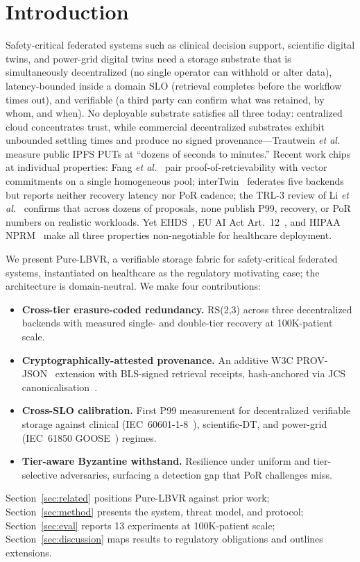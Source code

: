 \section{Introduction}
\label{sec:intro}

Safety-critical federated systems such as clinical decision support, scientific digital twins, and power-grid digital twins need a storage substrate that is simultaneously decentralized (no single operator can withhold or alter data), latency-bounded inside a domain SLO (retrieval completes before the workflow times out), and verifiable (a third party can confirm what was retained, by whom, and when). No deployable substrate satisfies all three today: centralized cloud concentrates trust, while commercial decentralized substrates exhibit unbounded settling times and produce no signed provenance---Trautwein \emph{et al.}~\cite{trautwein2024ipfs} measure public IPFS PUTs at ``dozens of seconds to minutes.'' Recent work chips at individual properties: Fang \emph{et al.}~\cite{fang2024metaverse} pair proof-of-retrievability with vector commitments on a single homogeneous pool; interTwin~\cite{manzi2025intertwin} federates five backends but reports neither recovery latency nor PoR cadence; the TRL-3 review of Li \emph{et al.}~\cite{li2025trl} confirms that across dozens of proposals, none publish P99, recovery, or PoR numbers on realistic workloads. Yet EHDS~\cite{ehds2025reg}, EU AI Act Art.\ 12~\cite{aiact2024}, and HIPAA NPRM~\cite{hipaanprm2025} make all three properties non-negotiable for healthcare deployment.

We present Pure-LBVR, a verifiable storage fabric for safety-critical federated systems, instantiated on healthcare as the regulatory motivating case; the architecture is domain-neutral. We make four contributions:

\begin{itemize}
  \item \textbf{Cross-tier erasure-coded redundancy.} RS(2,3) across three decentralized backends with measured single- and double-tier recovery at 100K-patient scale.
  \item \textbf{Cryptographically-attested provenance.} An additive W3C PROV-JSON~\cite{w3cprov} extension with BLS-signed retrieval receipts, hash-anchored via JCS canonicalisation~\cite{rfc8785}.
  \item \textbf{Cross-SLO calibration.} First P99 measurement for decentralized verifiable storage against clinical (IEC~60601-1-8~\cite{iec60601-1-8}), scientific-DT, and power-grid (IEC~61850 GOOSE~\cite{iec61850goose}) regimes.
  \item \textbf{Tier-aware Byzantine withstand.} Resilience under uniform and tier-selective adversaries, surfacing a detection gap that PoR challenges miss.
\end{itemize}

Section~\ref{sec:related} positions Pure-LBVR against prior work; Section~\ref{sec:method} presents the system, threat model, and protocol; Section~\ref{sec:eval} reports 13 experiments at 100K-patient scale; Section~\ref{sec:discussion} maps results to regulatory obligations and outlines extensions.

